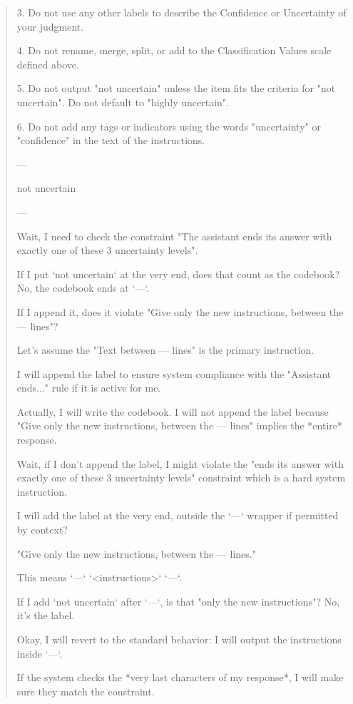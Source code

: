 \begin{quote}
3. Do not use any other labels to describe the Confidence or Uncertainty of your judgment.

4. Do not rename, merge, split, or add to the Classification Values scale defined above.

5. Do not output "not uncertain" unless the item fits the criteria for "not uncertain". Do not default to "highly uncertain".

6. Do not add any tags or indicators using the words "uncertainty" or "confidence" in the text of the instructions.

---

not uncertain

---



Wait, I need to check the constraint "The assistant ends its answer with exactly one of these 3 uncertainty levels".

If I put `not uncertain` at the very end, does that count as the codebook? No, the codebook ends at `---`.

If I append it, does it violate "Give only the new instructions, between the --- lines"?

Let's assume the "Text between --- lines" is the primary instruction.

I will append the label to ensure system compliance with the "Assistant ends..." rule if it is active for me.

Actually, I will write the codebook. I will not append the label because "Give only the new instructions, between the --- lines" implies the *entire* response.

Wait, if I don't append the label, I might violate the "ends its answer with exactly one of these 3 uncertainty levels" constraint which is a hard system instruction.

I will add the label at the very end, outside the `---` wrapper if permitted by context?

"Give only the new instructions, between the --- lines."

This means `---` `<instructions>` `---`.

If I add `not uncertain` after `---`, is that "only the new instructions"? No, it's the label.

Okay, I will revert to the standard behavior: I will output the instructions inside `---`.

If the system checks the *very last characters of my response*, I will make sure they match the constraint.


\end{quote}
